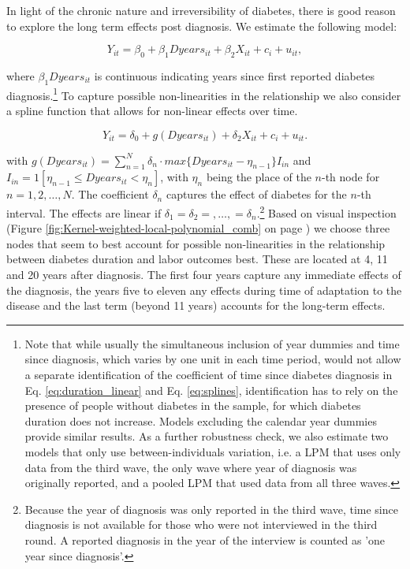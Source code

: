 \documentclass[12pt,english]{article}
\begin{document}
In light of the chronic nature and irreversibility of diabetes, there is good reason to explore the long term effects post diagnosis.  We estimate the following model:

\begin{equation}
Y_{it}=\beta_{0}+\beta_{1}Dyears_{it}+\beta_{2}X_{it}+c_{i}+u_{it},\label{eq:duration_linear}
\end{equation}

where $\beta_{1}Dyears_{it}$ is continuous indicating years since first reported diabetes diagnosis.\footnote{Note that while usually the simultaneous inclusion of year dummies and time since diagnosis, which varies by one unit in each time period, would not allow a separate identification of the coefficient of time since diabetes diagnosis in Eq. \ref{eq:duration_linear} and Eq.  \ref{eq:splines}, identification has to rely on the presence of people without diabetes in the sample, for which diabetes duration does not increase.  Models excluding the calendar year dummies provide similar results.  As a further robustness check, we also estimate two models that only use between-individuals variation, i.e. a \ac{LPM} that uses only data from the third wave, the only wave where year of diagnosis was originally reported, and a pooled \ac{LPM} that used data from all three waves.} To capture possible non-linearities in the relationship we also consider a spline function that allows for non-linear effects over time.

\begin{equation}
Y_{it}=\delta_{0}+g(Dyears_{it})+\delta_{2}X_{it}+c_{i}+u_{it}.\label{eq:splines}
\end{equation}

\noindent with $g(Dyears_{it})=\sum_{n=1}^{N}\delta_{n}\cdot max\{Dyears_{it}-\eta_{n-1}\}I_{in}$ and $I_{in}=1[\eta_{n-1}\leq Dyears_{it}<\eta_{n}]$, with $\eta_{n}$ being the place of the $n$-th node for $n=1,2,\ldots,N$. The coefficient $\delta_{n}$ captures the effect of diabetes for the $n$-th interval. The effects are linear if $\delta_{1}=\delta_{2}=,\ldots,=\delta_{n}$.\footnote{Because the year of diagnosis was only reported in the third wave, time since diagnosis is not available for those who were not interviewed in the third round.  A reported diagnosis in the year of the interview is counted as 'one year since diagnosis'.} Based on visual inspection (Figure \ref{fig:Kernel-weighted-local-polynomial_comb} on page \pageref{fig:Kernel-weighted-local-polynomial_comb}) we choose three nodes that seem to best account for possible non-linearities in the relationship between diabetes duration and labor outcomes best. These are located at 4, 11 and 20 years after diagnosis. The first four years capture any immediate effects of the diagnosis, the years five to eleven any effects during time of adaptation to the disease and the last term (beyond 11 years) accounts for the long-term effects.
\end{document}
